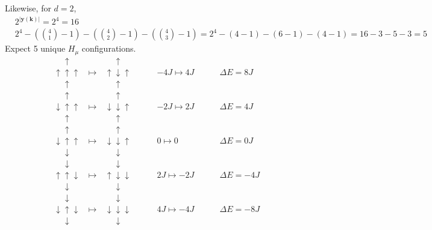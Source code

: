 \documentclass[10pt]{amsart}
\begin{document}
\begin{multicols*}{2}
Likewise, for $d=2$, 
\[
\begin{aligned} 
& 2^{ |\mathbf{y}(\mathbf{k}) | } = 2^4 = 16 \\ 
& 2^4 - \left( \binom{4}{1} - 1 \right) - \left( \binom{4}{2} - 1 \right) - \left( \binom{4}{3} - 1 \right) = 2^4-(4-1) - (6-1) - (4-1) = 16-3-5-3=5 
\end{aligned}
\]
Expect 5 unique $H_{\mu}$ configurations.  
\[
\begin{aligned}
	& \phantom{\uparrow} \uparrow  \,     &   &  \phantom{\uparrow} \uparrow \qquad \  & &  \\
	& \uparrow  \uparrow \uparrow \,     & \mapsto \,  & \uparrow  \downarrow \uparrow \qquad  \ & -4J \mapsto 4J  \qquad \  &  \Delta E = 8 J  \\
	& \phantom{\uparrow} \uparrow  \,    &   & \phantom{\uparrow} \uparrow    & \qquad \  & & \\  
		& \phantom{\uparrow} \uparrow  \,     &   &  \phantom{\uparrow} \uparrow \qquad \  & &  \\
	& \downarrow  \uparrow \uparrow \,     & \mapsto \,  & \downarrow  \downarrow \uparrow \qquad  \ & -2J \mapsto 2J  \qquad \  &  \Delta E = 4 J  \\
	& \phantom{\uparrow} \uparrow  \,    &   & \phantom{\uparrow} \uparrow    & \qquad \  & & \\
		& \phantom{\uparrow} \uparrow  \,     &   &  \phantom{\uparrow} \uparrow \qquad \  & &  \\
& \downarrow  \uparrow \uparrow \,     & \mapsto \,  & \downarrow  \downarrow \uparrow \qquad  \ & 0 \mapsto 0  \qquad \  &  \Delta E = 0 J  \\
& \phantom{\uparrow} \downarrow  \,    &   & \phantom{\uparrow} \downarrow    & \qquad \  & & \\	
		& \phantom{\uparrow} \downarrow  \,     &   &  \phantom{\uparrow} \downarrow \qquad \  & &  \\
& \uparrow  \uparrow \downarrow \,     & \mapsto \,  & \uparrow  \downarrow \downarrow \qquad  \ & 2J \mapsto -2J  \qquad \  &  \Delta E = -4 J  \\
& \phantom{\uparrow} \downarrow  \,    &   & \phantom{\uparrow} \downarrow    & \qquad \  & & \\
		& \phantom{\uparrow} \downarrow  \,     &   &  \phantom{\uparrow} \downarrow \qquad \  & &  \\
& \downarrow  \uparrow \downarrow \,     & \mapsto \,  & \downarrow  \downarrow \downarrow \qquad  \ & 4J \mapsto -4J  \qquad \  &  \Delta E = -8 J  \\
& \phantom{\uparrow} \downarrow  \,    &   & \phantom{\uparrow} \downarrow    & \qquad \  & & \\
\end{aligned}
\]



\end{multicols*}
\end{document}
